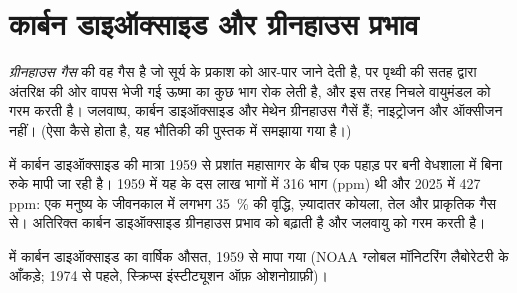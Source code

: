 \section{कार्बन डाइऑक्साइड और ग्रीनहाउस प्रभाव}

\begin{definition}[ग्रीनहाउस गैस]\label{def:g8:combustion-and-fuels:greenhouse}
\emph{ग्रीनहाउस गैस}  की वह गैस है जो
सूर्य के प्रकाश को आर-पार जाने देती है, पर पृथ्वी की सतह द्वारा अंतरिक्ष की
ओर वापस भेजी गई ऊष्मा का कुछ भाग रोक लेती है, और इस तरह निचले
वायुमंडल को गरम करती है। जलवाष्प, कार्बन डाइऑक्साइड और मेथेन ग्रीनहाउस
गैसें हैं; नाइट्रोजन और ऑक्सीजन नहीं। (ऐसा कैसे होता है, यह भौतिकी की पुस्तक
में समझाया गया है।)
\end{definition}

\begin{proposition}[वायु में कार्बन डाइऑक्साइड बढ़ रही है]\label{prop:g8:combustion-and-fuels:rising}
 में कार्बन डाइऑक्साइड की मात्रा 1959 से प्रशांत महासागर के बीच एक पहाड़
पर बनी वेधशाला में बिना रुके मापी जा रही है। 1959 में यह  के दस लाख
भागों में 316 भाग (ppm) थी और 2025 में 427
ppm: एक मनुष्य के जीवनकाल में लगभग \qty{35}{\percent} की वृद्धि,
ज़्यादातर कोयला, तेल और प्राकृतिक गैस  से। अतिरिक्त कार्बन
डाइऑक्साइड ग्रीनहाउस प्रभाव को बढ़ाती है और जलवायु को गरम करती है।
\end{proposition}

\begin{omfigure}

{\small {} में कार्बन डाइऑक्साइड का वार्षिक औसत, 1959 से मापा गया
(NOAA ग्लोबल मॉनिटरिंग लैबोरेटरी के आँकड़े; 1974 से पहले, स्क्रिप्स
इंस्टीट्यूशन ऑफ़ ओशनोग्राफ़ी)।}
\end{omfigure}

